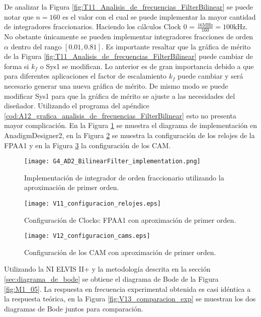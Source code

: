 	De analizar la Figura \ref{fig:T11_Analisis_de_frecuencias_FilterBilinear} se puede notar que $n = 160$ es el valor con el cual se puede implementar la mayor cantidad de integradores fraccionarios. Haciendo los cálculos Clock 0 = $\frac{16 \mathrm{MHz}}{160} = 100 \mathrm{kHz}$. No obstante únicamente se pueden implementar integradores fracciones de orden $\alpha$ dentro del rango $[0.01, 0.81]$. Es importante resaltar que la gráfica de mérito de la Figura \ref{fig:T11_Analisis_de_frecuencias_FilterBilinear} puede cambiar de forma si $k_{f}$ o Sys1 se modifican. Lo anterior es de gran importancia debido a que para diferentes aplicaciones el factor de escalamiento $k_{f}$ puede cambiar y será necesario generar una nueva gráfica de mérito. De mismo modo se puede modificar Sys1 para que la gráfica de mérito se ajuste a las necesidades del diseñador. Utilizando el programa del apéndice \ref{cod:A12_grafica_analisis_de_frecuencias_FilterBilinear} esto no presenta mayor complicación. En la Figura \ref{fig:G4_AD2_BilinearFilter_implementation} se muestra el diagrama de implementación en AnadigmDesigner2, en la Figura \ref{fig:V11_configuracion_relojes} se muestra la configuración de los relojes de la FPAA1 y en la Figura \ref{fig:V12_configuracion_cams} la configuración de los CAM.

	\begin{figure}[!ht] 
		\caption{Implementación de integrador de orden fraccionario utilizando la aproximación de primer orden.}
		\label{fig:G4_AD2_BilinearFilter_implementation}
		\centering
		\texttt{[image: G4\_AD2\_BilinearFilter\_implementation.png]}
	\end{figure}
	
	\begin{figure}[!ht] 
		\caption{Configuración de Clocks: FPAA1 con aproximación de primer orden.}
		\label{fig:V11_configuracion_relojes}
		\centering
		\texttt{[image: V11\_configuracion\_relojes.eps]}
	\end{figure}
	
	\begin{figure}[!ht] 
		\caption{Configuración de los CAM con aproximación de primer orden.}
		\label{fig:V12_configuracion_cams}
		\centering
		\texttt{[image: V12\_configuracion\_cams.eps]}
	\end{figure}
	
	Utilizando la NI ELVIS II+ y la metodología descrita en la sección \ref{sec:diagrama_de_bode} se obtiene el diagrama de Bode de la Figura \ref{fig:M1_05}. La respuesta en frecuencia experimental obtenida es casi idéntica a la respuesta teórica, en la Figura \ref{fig:V13_comparacion_exp} se muestran los dos diagramas de Bode juntos para comparación.
	
